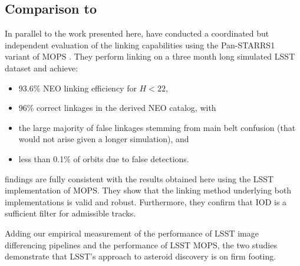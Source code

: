 \subsection{Comparison to \cite{VeresChesley2017mops}\label{sec:mopsVeresChesleyComparison}}

In parallel to the work presented here, \cite{VeresChesley2017mops} have conducted a coordinated but independent evaluation of the linking capabilities using the Pan-STARRS1 variant of MOPS \citep{denneau13}. They perform linking on a three month long simulated LSST dataset and achieve:

\begin{itemize}
	\item 93.6\% NEO linking efficiency for $H < 22$,
	\item 96\% correct linkages in the derived NEO catalog, with
	\item the large majority of false linkages stemming from main belt confusion (that would not arise given a longer simulation), and
	\item less than 0.1\% of orbits due to false detections.
\end{itemize}

\cite{VeresChesley2017mops} findings are fully consistent with the results obtained here using the LSST implementation of MOPS. They show that the linking method underlying both implementations is valid and robust. Furthermore, they confirm that IOD is a sufficient filter for admissible tracks.

Adding our empirical measurement of the performance of LSST image differencing pipelines and the performance of LSST MOPS, the two studies demonstrate that LSST's approach to asteroid discovery is on firm footing.